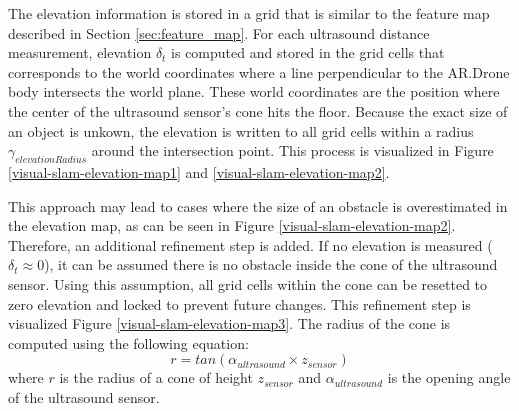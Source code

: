The elevation information is stored in a grid that is similar to the feature map described in Section \ref{sec:feature_map}.
For each ultrasound distance measurement, elevation $\delta_t$ is computed and stored in the grid cells that corresponds to the world coordinates where a line perpendicular to the AR.Drone body intersects the world plane.
These world coordinates are the position where the center of the ultrasound sensor's cone hits the floor.
Because the exact size of an object is unkown, the elevation is written to all grid cells within a radius $\gamma_{elevationRadius}$ around the intersection point.
This process is visualized in Figure \ref{visual-slam-elevation-map1} and \ref{visual-slam-elevation-map2}.

This approach may lead to cases where the size of an obstacle is overestimated in the elevation map, as can be seen in Figure \ref{visual-slam-elevation-map2}.
Therefore, an additional refinement step is added. %
If no elevation is measured ($\delta_t \approx 0$), it can be assumed there is no obstacle inside the cone of the ultrasound sensor.
Using this assumption, all grid cells within the cone can be resetted to zero elevation and locked to prevent future changes.
This refinement step is visualized Figure \ref{visual-slam-elevation-map3}.
The radius of the cone is computed using the following equation:
\begin{equation}
r = tan (\alpha_{ultrasound} \times z_{sensor})
\end{equation}
where $r$ is the radius of a cone of height $z_{sensor}$ and $\alpha_{ultrasound}$ is the opening angle of the ultrasound sensor.

